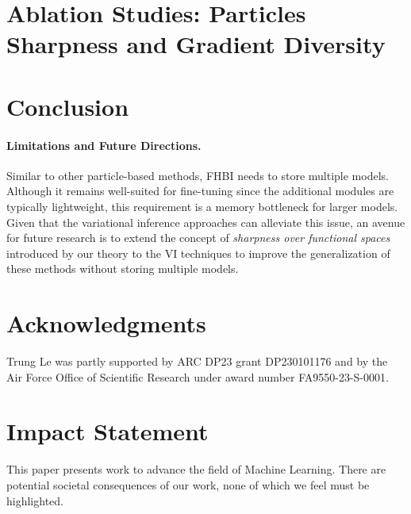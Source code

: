 \documentclass{article}
\theoremstyle{plain}
\theoremstyle{definition}
\theoremstyle{remark}
\begin{document}
\section{Ablation Studies: Particles Sharpness and Gradient Diversity}
\label{section: ablation}


\section{Conclusion}


\paragraph{Limitations and Future Directions.}

Similar to other particle-based methods, FHBI needs to store multiple models. Although it remains well-suited for fine-tuning since the additional modules are typically lightweight, this requirement is a memory bottleneck for larger models. Given that the variational inference approaches can alleviate this issue, an avenue for future research is to extend the concept of \textit{sharpness over functional spaces} introduced by our theory to the VI techniques to improve the generalization of these methods without storing multiple models.

\section*{Acknowledgments}
Trung Le was partly supported by ARC DP23 grant DP230101176 and by the Air Force Office of Scientific Research under award number FA9550-23-S-0001.


\section*{Impact Statement}
This paper presents work to advance the field of Machine Learning. There are potential societal consequences of our work, none of which we feel must be highlighted.





\newpage
\appendix
\onecolumn

\end{document}
